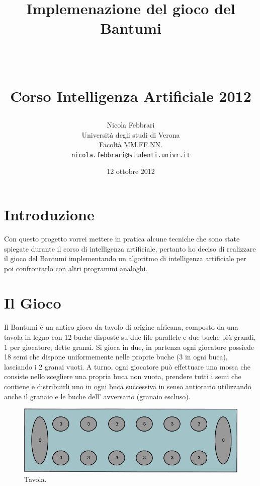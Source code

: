 \documentclass[paper=a4, fontsize=11pt]{scrartcl}	%
\title{ \vspace{-1in} 	\usefont{OT1}{bch}{b}{n}
		\huge \strut Implemenazione del gioco del Bantumi \strut \\
		\Large \bfseries \strut Corso Intelligenza Artificiale 2012 \strut
}
\author{ 									\usefont{OT1}{bch}{m}{n}
        Nicola Febbrari\\		\usefont{OT1}{bch}{m}{n}
        Universit\`a degli studi di Verona\\	\usefont{OT1}{bch}{m}{n}
        Facolt\`a MM.FF.NN.\\
        \texttt{nicola.febbrari@studenti.univr.it}
}
\date{12 ottobre 2012}
\numberwithin{equation}{section}															%
\numberwithin{figure}{section}																%
\numberwithin{table}{section}																%
\begin{document}
\maketitle
\section{Introduzione}
Con questo progetto vorrei mettere in pratica alcune  tecniche che sono state spiegate durante il corso di intelligenza artificiale, pertanto ho deciso di realizzare il gioco del Bantumi implementando un algoritmo di intelligenza artificiale per poi confrontarlo con altri programmi analoghi.

\section{Il Gioco}
Il Bantumi \`e un antico gioco da tavolo di origine africana, composto da una tavola in legno con 12 buche disposte su due file parallele e due buche pi\`u grandi, 1 per giocatore, dette granai.
Si gioca in due, in partenza ogni giocatore possiede 18 semi che dispone uniformemente nelle proprie buche (3 in ogni buca), lasciando i 2 granai vuoti.
A turno, ogni giocatore pu\`o effettuare una mossa che consiste nello scegliere una propria buca non vuota, prendere tutti i semi che contiene e distribuirli uno in ogni buca successiva in senso antiorario utilizzando anche il granaio e le buche dell' avversario (granaio escluso).



\begin{figure}[h]
\centering
        \includegraphics[totalheight=4.4cm]{Bantumi.png}
    \caption{Tavola.}
    \label{fig:verticalcell}
\end{figure}
\end{document}
